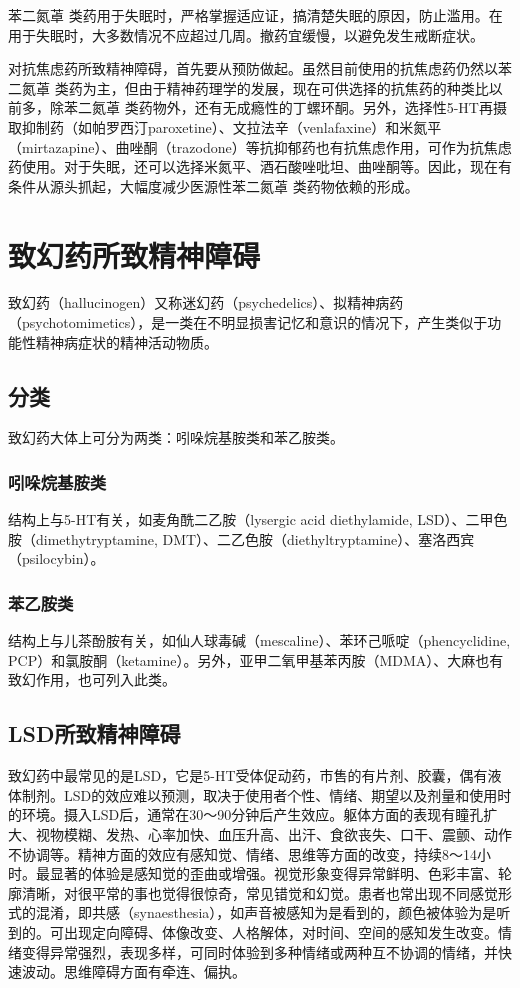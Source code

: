 苯二氮䓬
类药用于失眠时，严格掌握适应证，搞清楚失眠的原因，防止滥用。在用于失眠时，大多数情况不应超过几周。撤药宜缓慢，以避免发生戒断症状。

对抗焦虑药所致精神障碍，首先要从预防做起。虽然目前使用的抗焦虑药仍然以苯二氮䓬
类药为主，但由于精神药理学的发展，现在可供选择的抗焦药的种类比以前多，除苯二氮䓬
类药物外，还有无成瘾性的丁螺环酮。另外，选择性5-HT再摄取抑制药（如帕罗西汀paroxetine）、文拉法辛（venlafaxine）和米氮平（mirtazapine）、曲唑酮（trazodone）等抗抑郁药也有抗焦虑作用，可作为抗焦虑药使用。对于失眠，还可以选择米氮平、酒石酸唑吡坦、曲唑酮等。因此，现在有条件从源头抓起，大幅度减少医源性苯二氮䓬
类药物依赖的形成。

\section{致幻药所致精神障碍}

致幻药（hallucinogen）又称迷幻药（psychedelics）、拟精神病药（psychotomimetics），是一类在不明显损害记忆和意识的情况下，产生类似于功能性精神病症状的精神活动物质。

\subsection{分类}

致幻药大体上可分为两类：吲哚烷基胺类和苯乙胺类。

\subsubsection{吲哚烷基胺类}

结构上与5-HT有关，如麦角酰二乙胺（lysergic acid diethylamide,
LSD）、二甲色胺（dimethytryptamine,
DMT）、二乙色胺（diethyltryptamine）、塞洛西宾（psilocybin）。

\subsubsection{苯乙胺类}

结构上与儿茶酚胺有关，如仙人球毒碱（mescaline）、苯环己哌啶（phencyclidine,
PCP）和氯胺酮（ketamine）。另外，亚甲二氧甲基苯丙胺（MDMA）、大麻也有致幻作用，也可列入此类。

\subsection{LSD所致精神障碍}

致幻药中最常见的是LSD，它是5-HT受体促动药，市售的有片剂、胶囊，偶有液体制剂。LSD的效应难以预测，取决于使用者个性、情绪、期望以及剂量和使用时的环境。摄入LSD后，通常在30～90分钟后产生效应。躯体方面的表现有瞳孔扩大、视物模糊、发热、心率加快、血压升高、出汗、食欲丧失、口干、震颤、动作不协调等。精神方面的效应有感知觉、情绪、思维等方面的改变，持续8～14小时。最显著的体验是感知觉的歪曲或增强。视觉形象变得异常鲜明、色彩丰富、轮廓清晰，对很平常的事也觉得很惊奇，常见错觉和幻觉。患者也常出现不同感觉形式的混淆，即共感（synaesthesia），如声音被感知为是看到的，颜色被体验为是听到的。可出现定向障碍、体像改变、人格解体，对时间、空间的感知发生改变。情绪变得异常强烈，表现多样，可同时体验到多种情绪或两种互不协调的情绪，并快速波动。思维障碍方面有牵连、偏执。

